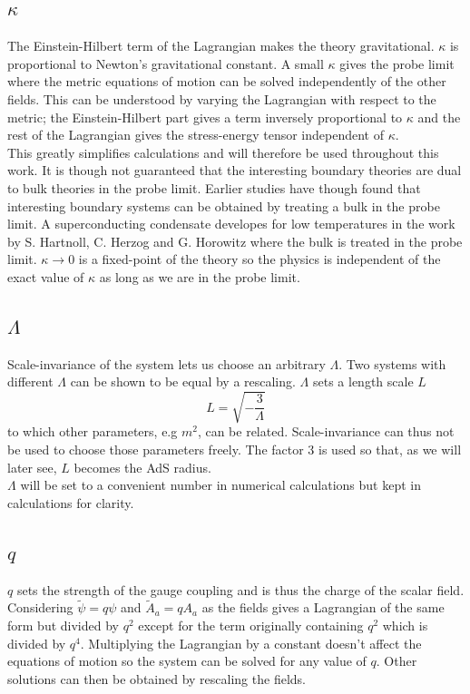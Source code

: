\documentclass[12pt]{report}
\begin{document}
\subsection{$\kappa$\label{s:kappa}}
The Einstein-Hilbert term of the Lagrangian makes the theory gravitational. $\kappa$ is proportional to Newton's gravitational constant. A small $\kappa$ gives the probe limit where the metric equations of motion can be solved independently of the other fields. This can be understood by varying the Lagrangian with respect to the metric; the Einstein-Hilbert part gives a term inversely proportional to $\kappa$ and the rest of the Lagrangian gives the stress-energy tensor independent of $\kappa$.\\

This greatly simplifies calculations and will therefore be used throughout this work. It is though not guaranteed that the interesting boundary theories are dual to bulk theories in the probe limit. Earlier studies have though found that interesting boundary systems can be obtained by treating a bulk in the probe limit. A superconducting condensate developes for low temperatures in the work by S. Hartnoll, C. Herzog and G. Horowitz \cite{hartnoll9} where the bulk is treated in the probe limit. $\kappa\rightarrow0$ is a fixed-point of the theory so the physics is independent of the exact value of $\kappa$ as long as we are in the probe limit.
\subsection{$\Lambda$}
Scale-invariance of the system lets us choose an arbitrary $\Lambda$. Two systems with different $\Lambda$ can be shown to be equal by a rescaling. $\Lambda$ sets a length scale $L$
\begin{equation}
L=\sqrt{-\frac{3}{\Lambda}}
\end{equation}
to which other parameters, e.g $m^2$, can be related. Scale-invariance can thus not be used to choose those parameters freely. The factor 3 is used so that, as we will later see, $L$ becomes the AdS radius.\\

$\Lambda$ will be set to a convenient number in numerical calculations but kept in calculations for clarity.
\subsection{$q$}
$q$ sets the strength of the gauge coupling and is thus the charge of the scalar field. Considering $\tilde{\psi}=q\psi$ and $\tilde{A}_a=qA_a$ as the fields gives a Lagrangian of the same form but divided by $q^2$ except for the term originally containing $q^2$ which is divided by $q^4$. Multiplying the Lagrangian by a constant doesn't affect the equations of motion so the system can be solved for any value of $q$. Other solutions can then be obtained by rescaling the fields.\\
\end{document}
